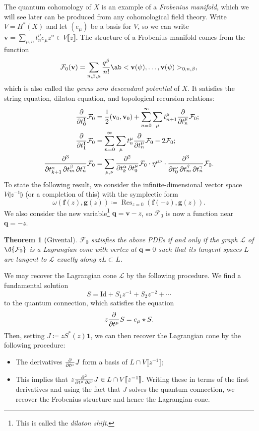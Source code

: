\documentclass{amsart}
\newtheorem{thm}{Theorem}[section]
\theoremstyle{definition}
\theoremstyle{remark}
\theoremstyle{plain}
\theoremstyle{definition}
\theoremstyle{remark}
\newcommand{\mc}[1]{\mathcal{#1}}
\newcommand{\mbf}[1]{\mathbf{#1}}
\newcommand{\bv}{\mbf{v}}
\newcommand{\bq}{\mbf{q}}
\newcommand{\mr}[1]{\mathrm{#1}}
\newcommand{\on}[1]{\operatorname{#1}}
\newcommand{\1}{\mathbf{1}}
\newcommand{\2}{\mathbf{2}}
\newcommand{\3}{\mathbf{3}}
\newcommand{\ps}[1]{\llbracket #1 \rrbracket}
\newcommand{\ls}[1]{\llparenthesis #1 \rrparenthesis}
\begin{document}
The quantum cohomology of \(X\) is an example of a \textit{Frobenius manifold}, which we will see later can be produced from any cohomological field theory. Write \(V = H^*(X)\) and let \((e_{\mu})\) be a basis for \(V\), so we can write $\bv = \sum_{\mu,n} t^{\mu}_n e_{\mu} z^n \in V\ps{z}$.
The structure of a Frobenius manifold comes from the function
\[
    \mc{F}_0(\bv) = \sum_{n, \beta, \mu} \frac{q^{\beta}}{n!} \ab<\bv(\psi), \ldots, \bv(\psi)>_{0,n,\beta},
\]
which is also called the \textit{genus zero descendant potential} of \(X\). It satisfies the string equation, dilaton equation, and topological recursion relations: 
\begin{align*}
    \pdv{}{t_0^1} \mc{F}_0 &= \frac{1}{2} (\bv_0, \bv_0) + \sum_{n=0}^{\infty} \sum_{\mu} t_{n+1}^{\mu} \pdv{}{t_n^{\mu}} \mc{F}_0; \\
    \pdv{}{t_1^1} \mc{F}_0 &= \sum_{n=0}^{\infty} \sum_{\mu} t_n^{\mu} \pdv{}{t_n^{\mu}}\mc{F}_0 - 2 \mc{F}_0; \\
    \pdv{}{t_{k+1}^{\alpha},t_m^{\beta},t_n^{\gamma}} \mc{F}_0 &= \sum_{\mu,\nu} \pdv{}{t_k^{\alpha},t_0^{\mu}} \mc{F}_0 \cdot \eta^{\mu\nu} \cdot \pdv{}{t_0^{\nu},t_{m}^{\beta},t_n^{\gamma}} \mc{F}_0.
\end{align*}
To state the following result, we consider the infinite-dimensional vector space $V\ls{z^{-1}}$ (or a completion of this) with the symplectic form
\[ \omega(\mbf{f}(z), \mbf{g}(z)) \coloneqq \on{Res}_{z=0}(\mbf{f}(-z), \mbf{g}(z)). \]
We also consider the new variable\footnote{This is called the \textit{dilaton shift}.} $\bq = \bv - z$, so $\mc{F}_0$ is now a function near $\bq = -z$.

\begin{thm}[Givental]
    $\mc{F}_0$ satisfies the above PDEs if and only if the graph $\mc{L}$ of $\d{\mc{F}_0}$ is a Lagrangian cone with vertex at $\bq = 0$ such that its tangent spaces $L$ are tangent to $\mc{L}$ exactly along $zL \subset L$.
\end{thm}

We may recover the Lagrangian cone $\mc{L}$ by the following procedure. We find a fundamental solution 
\[ S = \mr{Id} + S_1 z^{-1} + S_2 z^{-2} + \cdots \]
to the quantum connection, which satisfies the equation
\[ z \pdv{}{t^{\mu}}S = e_{\mu} \star S. \]
Then, setting $J \coloneqq z S^*(z) \1$, we can then recover the Lagrangian cone by the following procedure:
\begin{itemize}
    \item The derivatives $\pdv{}{t^{\mu}} J$ form a basis of $L \cap V\ps{z^{-1}}$;
    \item This implies that $z \pdv{}{t^{\mu},t^{\nu}} J \in L \cap V \ps{z^{-1}}$. Writing these in terms of the first derivatives and using the fact that $J$ solves the quantum connection, we recover the Frobenius structure and hence the Lagrangian cone.
\end{itemize}
\end{document}
